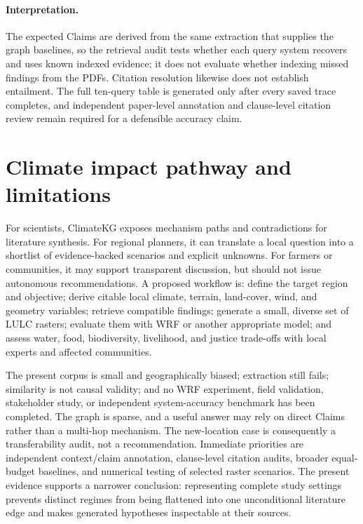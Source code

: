 \documentclass{article}
\newcommand{\system}{ClimateKG}
\begin{document}
\paragraph{Interpretation.}
The expected Claims are derived from the same extraction that supplies the graph baselines, so the retrieval audit tests whether each query system recovers and uses known indexed evidence; it does not evaluate whether indexing missed findings from the PDFs. Citation resolution likewise does not establish entailment. The full ten-query table is generated only after every saved trace completes, and independent paper-level annotation and clause-level citation review remain required for a defensible accuracy claim.

\section{Climate impact pathway and limitations}
For scientists, \system{} exposes mechanism paths and contradictions for literature synthesis. For regional planners, it can translate a local question into a shortlist of evidence-backed scenarios and explicit unknowns. For farmers or communities, it may support transparent discussion, but should not issue autonomous recommendations. A proposed workflow is: define the target region and objective; derive citable local climate, terrain, land-cover, wind, and geometry variables; retrieve compatible findings; generate a small, diverse set of LULC rasters; evaluate them with WRF or another appropriate model; and assess water, food, biodiversity, livelihood, and justice trade-offs with local experts and affected communities.

The present corpus is small and geographically biased; extraction still fails; similarity is not causal validity; and no WRF experiment, field validation, stakeholder study, or independent system-accuracy benchmark has been completed. The graph is sparse, and a useful answer may rely on direct Claims rather than a multi-hop mechanism. The new-location case is consequently a transferability audit, not a recommendation. Immediate priorities are independent context/claim annotation, clause-level citation audits, broader equal-budget baselines, and numerical testing of selected raster scenarios. The present evidence supports a narrower conclusion: representing complete study settings prevents distinct regimes from being flattened into one unconditional literature edge and makes generated hypotheses inspectable at their sources.

\clearpage



\clearpage
\appendix

\end{document}
